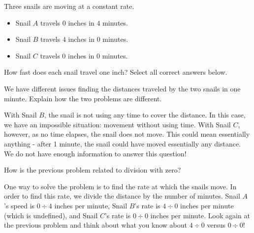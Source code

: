 \documentclass[nooutcomes]{ximera}
\begin{document}
\begin{problem}
Three snails are moving at a constant rate.

\begin{itemize}
	\item Snail $A$ travels $0$ inches in $4$ minutes.
	\item Snail $B$ travels $4$ inches in $0$ minutes.
	\item Snail $C$ travels $0$ inches in $0$ minutes.
\end{itemize}

How fast does each snail travel one inch?  Select all correct answers below.
\begin{selectAll}
\end{selectAll}

\begin{problem}
We have different issues finding the distances traveled by the two snails in one minute.  Explain how the two problems are different.
\begin{freeResponse}
	\begin{hint}
	With Snail $B$, the snail is not using any time to cover the distance.  In this case, we have an impossible situation: movement without using time.  With Snail $C$, however, as no time elapses, the snail does not move.  This could mean essentially anything - after 1 minute, the snail could have moved essentially any distance.  We do not have enough information to answer this question!
	\end{hint}
\end{freeResponse}
\end{problem}
\end{problem}



\begin{problem}
How is the previous problem related to division with zero?
\begin{freeResponse}
	One way to solve the problem is to find the rate at which the snails move.  In order to find this rate, we divide the distance by the number of minutes.  Snail $A$'s speed is $0 \div 4$ inches per minute, Snail $B$'s rate is $4 \div 0$ inches per minute (which is undefined), and Snail $C$'s rate is $0 \div 0$ inches per minute.  Look again at the previous problem and think about what you know about $4 \div 0$ versus $0 \div 0$!
\end{freeResponse}
\end{problem}
\end{document}

